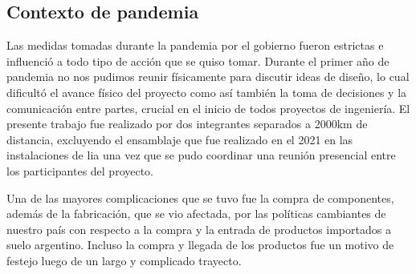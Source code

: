 \subsection{Contexto de pandemia}
Las medidas tomadas durante la pandemia por el gobierno fueron estrictas e influenció a todo tipo de acción que se quiso tomar. Durante el primer año de pandemia no nos pudimos reunir físicamente para discutir ideas de diseño, lo cual dificultó el avance físico del proyecto como así también la toma de decisiones y la comunicación entre partes, crucial en el inicio de todos proyectos de ingeniería.
El presente trabajo fue realizado por dos integrantes separados a 2000km de distancia, excluyendo el ensamblaje que fue realizado en el 2021 en las instalaciones de \gls{lia} una vez que se pudo coordinar una reunión presencial entre los participantes del proyecto.
\medskip

Una de las mayores complicaciones que se tuvo fue la compra de
componentes, además de la fabricación, que se vio afectada, por las políticas cambiantes de
nuestro país con respecto a la compra y la entrada de productos importados a suelo argentino.
Incluso la compra y llegada de los productos fue un motivo de festejo luego de un largo y complicado trayecto.
